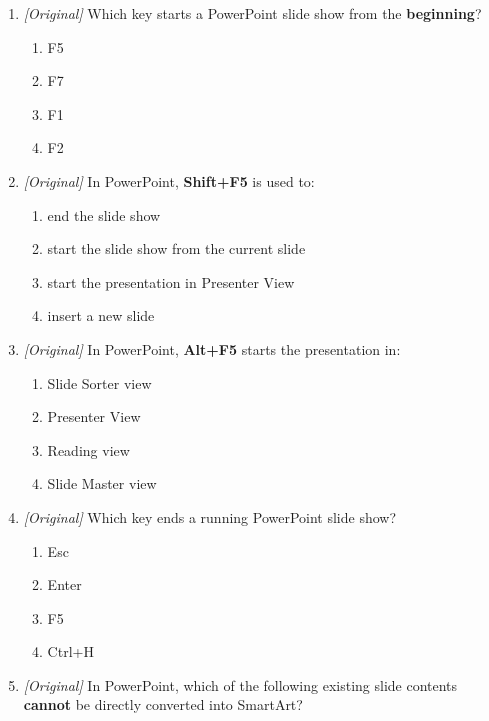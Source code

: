 \begin{enumerate}[label=\textbf{Q\arabic*.}, leftmargin=*]
  split?
  \begin{enumerate}[label=\Alph*.]
    \item Alt+Shift+C
    \item Ctrl+Shift+C
    \item Ctrl+Alt+C
    \item Alt+Ctrl+V
  \end{enumerate}
\item \textit{[Original]} Which key starts a PowerPoint slide show from the
  \textbf{beginning}?
  \begin{enumerate}[label=\Alph*.]
    \item F5
    \item F7
    \item F1
    \item F2
  \end{enumerate}
\item \textit{[Original]} In PowerPoint, \textbf{Shift+F5} is used to:
  \begin{enumerate}[label=\Alph*.]
    \item end the slide show
    \item start the slide show from the current slide
    \item start the presentation in Presenter View
    \item insert a new slide
  \end{enumerate}
\item \textit{[Original]} In PowerPoint, \textbf{Alt+F5} starts the
  presentation in:
  \begin{enumerate}[label=\Alph*.]
    \item Slide Sorter view
    \item Presenter View
    \item Reading view
    \item Slide Master view
  \end{enumerate}
\item \textit{[Original]} Which key ends a running PowerPoint slide show?
  \begin{enumerate}[label=\Alph*.]
    \item Esc
    \item Enter
    \item F5
    \item Ctrl+H
  \end{enumerate}
\item \textit{[Original]} In PowerPoint, which of the following existing slide
  contents \textbf{cannot} be directly converted into SmartArt?

\end{enumerate}
